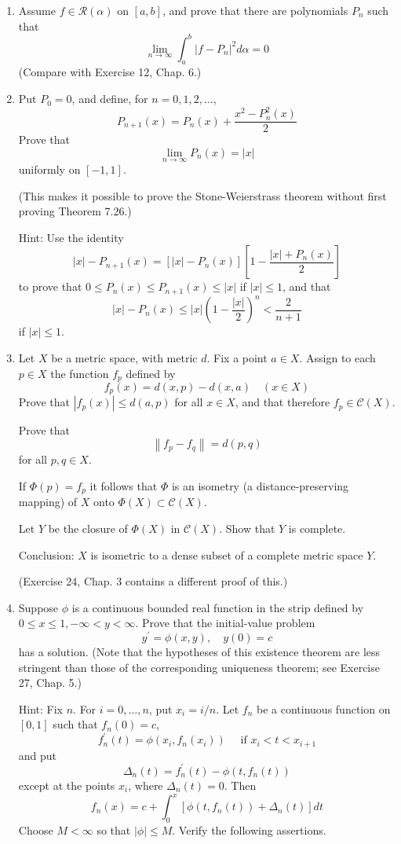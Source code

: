 \documentclass[10pt]{article}
\begin{document}
\begin{enumerate}
  \item Assume $f \in \mathscr{R}(\alpha)$ on $[a, b]$, and prove that there are polynomials $P_{n}$ such that
  $$
  \lim _{n \rightarrow \infty} \int_{a}^{b}\left|f-P_{n}\right|^{2} d \alpha=0
  $$
  (Compare with Exercise 12, Chap. 6.)

  \item Put $P_{0}=0$, and define, for $n=0,1,2, \ldots$,
  $$
  P_{n+1}(x)=P_{n}(x)+\frac{x^{2}-P_{n}^{2}(x)}{2}
  $$
  Prove that
  $$
  \lim _{n \rightarrow \infty} P_{n}(x)=|x|
  $$
  uniformly on $[-1,1]$.

  (This makes it possible to prove the Stone-Weierstrass theorem without first proving Theorem 7.26.)

  Hint: Use the identity
  $$
  |x|-P_{n+1}(x)=\left[|x|-P_{n}(x)\right]\left[1-\frac{|x|+P_{n}(x)}{2}\right]
  $$
  to prove that $0 \leq P_{n}(x) \leq P_{n+1}(x) \leq|x|$ if $|x| \leq 1$, and that
  $$
  |x|-P_{n}(x) \leq|x|\left(1-\frac{|x|}{2}\right)^{n}<\frac{2}{n+1}
  $$
  if $|x| \leq 1$.

  \item Let $X$ be a metric space, with metric $d$. Fix a point $a \in X$. Assign to each $p \in X$ the function $f_{p}$ defined by
  $$
  f_{p}(x)=d(x, p)-d(x, a) \quad(x \in X)
  $$
  Prove that $\left|f_{p}(x)\right| \leq d(a, p)$ for all $x \in X$, and that therefore $f_{p} \in \mathscr{C}(X)$.

  Prove that
  $$
  \left\|f_{p}-f_{q}\right\|=d(p, q)
  $$
  for all $p, q \in X$.

  If $\Phi(p)=f_{p}$ it follows that $\Phi$ is an isometry (a distance-preserving mapping) of $X$ onto $\Phi(X) \subset \mathscr{C}(X)$.

  Let $Y$ be the closure of $\Phi(X)$ in $\mathscr{C}(X)$. Show that $Y$ is complete.

  Conclusion: $X$ is isometric to a dense subset of a complete metric space $Y$.

  (Exercise 24, Chap. 3 contains a different proof of this.)

  \item Suppose $\phi$ is a continuous bounded real function in the strip defined by $0 \leq x \leq 1,-\infty<y<\infty$. Prove that the initial-value problem
  $$
  y^{\prime}=\phi(x, y), \quad y(0)=c
  $$
  has a solution. (Note that the hypotheses of this existence theorem are less stringent than those of the corresponding uniqueness theorem; see Exercise 27, Chap. 5.)

  Hint: Fix $n$. For $i=0, \ldots, n$, put $x_{i}=i / n$. Let $f_{n}$ be a continuous function on $[0,1]$ such that $f_{n}(0)=c$,
  $$
  f_{n}^{\prime}(t)=\phi\left(x_{i}, f_{n}\left(x_{i}\right)\right) \quad \text { if } x_{i}<t<x_{i+1}
  $$
  and put
  $$
  \Delta_{n}(t)=f_{n}^{\prime}(t)-\phi\left(t, f_{n}(t)\right)
  $$
  except at the points $x_{i}$, where $\Delta_{n}(t)=0$. Then
  $$
  f_{n}(x)=c+\int_{0}^{x}\left[\phi\left(t, f_{n}(t)\right)+\Delta_{n}(t)\right] d t
  $$
  Choose $M<\infty$ so that $|\phi| \leq M$. Verify the following assertions.


\end{enumerate}
\end{document}
